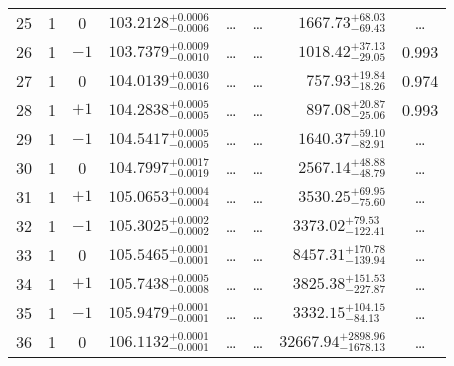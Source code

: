 \begin{table*}[!]
\begin{tabular}{llcrrlrc}
25 & 1 & 0 & $    103.2128_{-      0.0006}^{+      0.0006}$ & \multicolumn{1}{c}{\dots} & \multicolumn{1}{c}{\dots} & $     1667.73_{-       69.43}^{+       68.03}$ & \dots\\[1pt]
26 & 1 & $-1$ & $    103.7379_{-      0.0010}^{+      0.0009}$ & \multicolumn{1}{c}{\dots} & \multicolumn{1}{c}{\dots} & $     1018.42_{-       29.05}^{+       37.13}$ & 0.993\\[1pt]
27 & 1 & 0 & $    104.0139_{-      0.0016}^{+      0.0030}$ & \multicolumn{1}{c}{\dots} & \multicolumn{1}{c}{\dots} & $      757.93_{-       18.26}^{+       19.84}$ & 0.974\\[1pt]
28 & 1 & $+1$ & $    104.2838_{-      0.0005}^{+      0.0005}$ & \multicolumn{1}{c}{\dots} & \multicolumn{1}{c}{\dots} & $      897.08_{-       25.06}^{+       20.87}$ & 0.993\\[1pt]
29 & 1 & $-1$ & $    104.5417_{-      0.0005}^{+      0.0005}$ & \multicolumn{1}{c}{\dots} & \multicolumn{1}{c}{\dots} & $     1640.37_{-       82.91}^{+       59.10}$ &\dots\\[1pt]
30 & 1 & 0 & $    104.7997_{-      0.0019}^{+      0.0017}$ & \multicolumn{1}{c}{\dots} & \multicolumn{1}{c}{\dots} & $     2567.14_{-       48.79}^{+       48.88}$ &\dots\\[1pt]
31 & 1 & $+1$ & $    105.0653_{-      0.0004}^{+      0.0004}$ & \multicolumn{1}{c}{\dots} & \multicolumn{1}{c}{\dots} & $     3530.25_{-       75.60}^{+       69.95}$ &\dots\\[1pt]
32 & 1 & $-1$ & $    105.3025_{-      0.0002}^{+      0.0002}$ & \multicolumn{1}{c}{\dots} & \multicolumn{1}{c}{\dots} & $     3373.02_{-      122.41}^{+       79.53}$ &\dots\\[1pt]
33 & 1 & 0 & $    105.5465_{-      0.0001}^{+      0.0001}$ & \multicolumn{1}{c}{\dots} & \multicolumn{1}{c}{\dots} & $     8457.31_{-      139.94}^{+      170.78}$ &\dots\\[1pt]
34 & 1 & $+1$ & $    105.7438_{-      0.0008}^{+      0.0005}$ & \multicolumn{1}{c}{\dots} & \multicolumn{1}{c}{\dots} & $     3825.38_{-      227.87}^{+      151.53}$ &\dots\\[1pt]
35 & 1 & $-1$ & $    105.9479_{-      0.0001}^{+      0.0001}$ & \multicolumn{1}{c}{\dots} & \multicolumn{1}{c}{\dots} & $     3332.15_{-       84.13}^{+      104.15}$ &\dots\\[1pt]
36 & 1 & 0 & $    106.1132_{-      0.0001}^{+      0.0001}$ & \multicolumn{1}{c}{\dots} & \multicolumn{1}{c}{\dots} & $    32667.94_{-     1678.13}^{+     2898.96}$ &\dots\\[1pt]

\end{tabular}
\end{table*}
